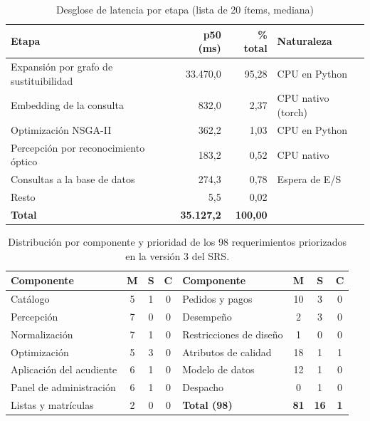 \begin{table}[htbp]
\centering
\caption{Desglose de latencia por etapa (lista de 20 ítems, mediana)}
\label{tab:latencia}
\small
\begin{tabular}{@{}p{6.2cm}rrp{3.2cm}@{}}
\toprule
\textbf{Etapa} & \textbf{p50 (ms)} & \textbf{\% total} & \textbf{Naturaleza} \\
\midrule
Expansión por grafo de sustituibilidad & 33.470,0 & 95,28 & CPU en Python \\
Embedding de la consulta & 832,0 & 2,37 & CPU nativo (torch) \\
Optimización NSGA-II & 362,2 & 1,03 & CPU en Python \\
Percepción por reconocimiento óptico & 183,2 & 0,52 & CPU nativo \\
Consultas a la base de datos & 274,3 & 0,78 & Espera de E/S \\
Resto & 5,5 & 0,02 & \\
\midrule
\textbf{Total} & \textbf{35.127,2} & \textbf{100,00} & \\
\bottomrule
\end{tabular}
\end{table}

\begin{table}[H]
\centering\footnotesize
\setlength{\tabcolsep}{4pt}
\renewcommand{\arraystretch}{1.15}
\caption{Distribución por componente y prioridad de los 98 requerimientos priorizados en la versión 3 del SRS.}
\label{tab:moscow}
\begin{tabular}{@{}lccclccc@{}}
\toprule
\textbf{Componente} & \textbf{M} & \textbf{S} & \textbf{C} &
\textbf{Componente} & \textbf{M} & \textbf{S} & \textbf{C} \\
\midrule
Catálogo & 5 & 1 & 0 & Pedidos y pagos & 10 & 3 & 0 \\
Percepción & 7 & 0 & 0 & Desempeño & 2 & 3 & 0 \\
Normalización & 7 & 1 & 0 & Restricciones de diseño & 1 & 0 & 0 \\
Optimización & 5 & 3 & 0 & Atributos de calidad & 18 & 1 & 1 \\
Aplicación del acudiente & 6 & 1 & 0 & Modelo de datos & 12 & 1 & 0 \\
Panel de administración & 6 & 1 & 0 & Despacho & 0 & 1 & 0 \\
Listas y matrículas & 2 & 0 & 0 & \textbf{Total (98)} & \textbf{81} & \textbf{16} &
\textbf{1} \\
\bottomrule
\end{tabular}
\end{table}
